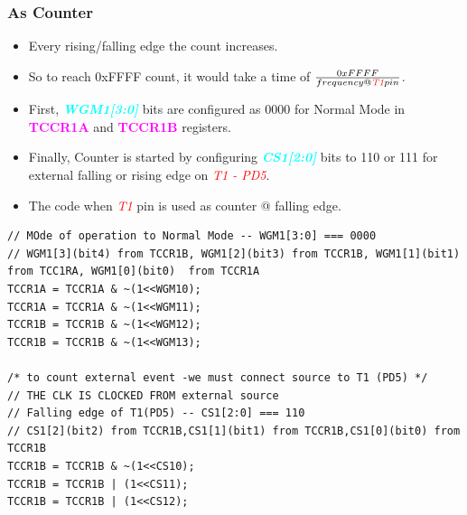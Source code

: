 \documentclass{article}
\newcommand{\bitFormat}[1]{\emph{\textbf{\textcolor{cyan}{#1}}}}
\newcommand{\regFormat}[1]{\textbf{\textcolor{magenta}{#1}}}
\newcommand{\pinFormat}[1]{\emph{\textcolor{red}{#1}}}
\begin{document}
\subsubsection{As Counter}
\begin{itemize}
    \item Every rising/falling edge the count increases.
    \item So to reach 0xFFFF count, it would take a time of $\frac{0xFFFF}{frequency @ \pinFormat{T1} pin}$.
    \item First, \bitFormat{WGM1[3:0]} bits are configured as 0000 for Normal Mode in \regFormat{TCCR1A} and \regFormat{TCCR1B} registers.
    \item Finally, Counter is started by configuring \bitFormat{CS1[2:0]} bits to 110 or 111 for external falling or rising edge on \pinFormat{T1 - PD5}.
    \item The code when \pinFormat{T1} pin is used as counter @ falling edge.
\end{itemize}
\begin{verbatim}
// MOde of operation to Normal Mode -- WGM1[3:0] === 0000
// WGM1[3](bit4) from TCCR1B, WGM1[2](bit3) from TCCR1B, WGM1[1](bit1)  from TCC1RA, WGM1[0](bit0)  from TCCR1A	
TCCR1A = TCCR1A & ~(1<<WGM10);
TCCR1A = TCCR1A & ~(1<<WGM11);
TCCR1B = TCCR1B & ~(1<<WGM12);
TCCR1B = TCCR1B & ~(1<<WGM13);
    
/* to count external event -we must connect source to T1 (PD5) */
// THE CLK IS CLOCKED FROM external source
// Falling edge of T1(PD5) -- CS1[2:0] === 110
// CS1[2](bit2) from TCCR1B,CS1[1](bit1) from TCCR1B,CS1[0](bit0) from TCCR1B
TCCR1B = TCCR1B & ~(1<<CS10);
TCCR1B = TCCR1B | (1<<CS11);
TCCR1B = TCCR1B | (1<<CS12);
\end{verbatim}
\end{document}
